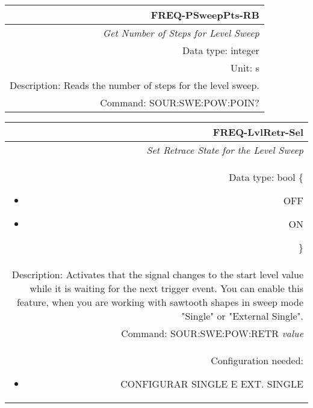 \documentclass[openany]{article}
\begin{document}
		\begin{tabular}{N}
			\hline
			\bfseries FREQ-PSweepPts-RB \\ \hline
			\emph{Get Number of Steps for Level Sweep} \\
			Data type: integer \\
			Unit: s \\
			Description: Reads the number of steps for the level sweep. \\
			Command: SOUR:SWE:POW:POIN? \\

		\end{tabular}
%
		\begin{tabular}{N}
			\hline
			\bfseries FREQ-LvlRetr-Sel \\ \hline
			\emph{Set Retrace State for the Level Sweep} \\
			Data type: bool \{\begin{itemize}[noitemsep]
				\small
				\item[] OFF
				\item[] ON
			\end{itemize}\} \\
			Description: Activates that the signal changes to the start level value while it is waiting for the next trigger event. You can enable this feature, when you are working with sawtooth shapes in sweep mode "Single" or "External Single". \\
			Command: SOUR:SWE:POW:RETR \emph{value} \\
			Configuration needed:\begin{itemize}[noitemsep]
				\small
				\item[] CONFIGURAR SINGLE E EXT. SINGLE
			\end{itemize} \\

		\end{tabular}
\end{document}
